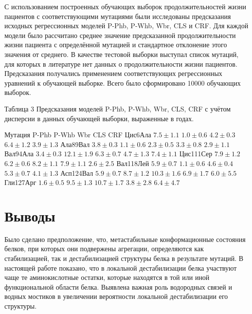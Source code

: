 С использованием построенных обучающих выборок продолжительностей жизни пациентов с соответствующими мутациями были исследованы предсказания исходных регрессионных моделей P-Phb, P-Whb, Wbr, CLS и CRF. Для каждой модели было рассчитано среднее значение предсказанной продолжительности жизни пациента с определённой мутацией и стандартное отклонение этого значения от среднего. В качестве тестовой выборки выступал список мутаций, для которых в литературе нет данных о продолжительности жизни пациентов. Предсказания получались применением соответствующих регрессионных уравнений к обучающей выборке. Всего было сформировано 10000 обучающих выборок.

Таблица 3
Предсказания моделей  P-Phb, P-Whb, Wbr, CLS, CRF с учётом дисперсии в данных обучающей выборки, выраженные в годах.

Мутация
P-Phb
P-Whb
Wbr
CLS
CRF
Цис6Ала
$7.5\pm1.1$
$1.0\pm0.6$
$4.2\pm0.3$
$6.4\pm1.2$
$3.9\pm1.3$
Ала89Вал
$3.8\pm0.3$
$1.1\pm0.6$
$2.3\pm0.5$
$3.3\pm0.8$
$2.9\pm1.1$
Вал94Ала
$3.4\pm0.3$
$12.1\pm1.9$
$6.3\pm0.7$
$4.7\pm1.3$
$7.4\pm1.1$
Цис111Сер
$7.9\pm1.2$
$6.2\pm0.6$
$8.2\pm1.1$
$7.9\pm1.1$
$2.6\pm2.5$
Вал118Лей
$5.9\pm0.7$
$1.1\pm0.6$
$4.6\pm0.4$
$5.3\pm0.7$
$4.1\pm1.3$
Асп124Вал
$5.9\pm0.7$
$8.7\pm1.2$
$10.3\pm1.6$
$6.9\pm1.7$
$6.0\pm5.5$
Гли127Арг
$1.6\pm0.5$
$9.5\pm1.3$
$10.7\pm1.7$
$3.8\pm2.8$
$6.4\pm4.7$

\section{Выводы} \label{sect_MD_implications}

Было сделано предположение, что, метастабильные конформационные состояния белков, при которых они подвержены агрегации, определяются как стабилизацией, так и дестабилизацией структуры белка в результате мутаций. В настоящей работе показано, что в локальной дестабилизации белка участвуют чаще те аминокислотные остатки, которые находятся в той или иной функциональной области белка. Выявлена важная роль водородных связей и водных мостиков в увеличении вероятности локальной дестабилизации его структуры. 

